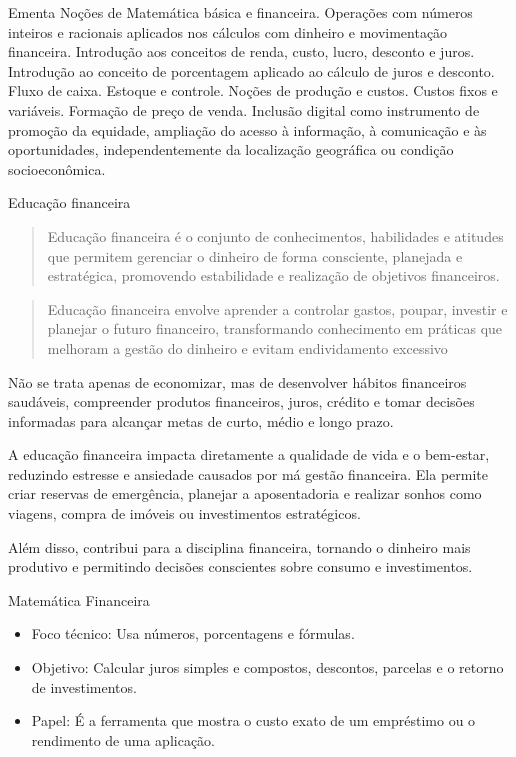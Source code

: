\documentclass{if-beamer}
\begin{document}
	\begin{frame}{Ementa}
		Noções de Matemática básica e financeira. Operações com números
		inteiros e racionais aplicados nos cálculos com dinheiro e 
		movimentação financeira. Introdução aos conceitos de renda, custo, lucro, desconto e juros. Introdução ao conceito de porcentagem aplicado ao cálculo de juros e desconto. Fluxo de caixa. Estoque e controle. Noções de produção e custos. Custos	fixos e variáveis. Formação de preço de venda. Inclusão digital como instrumento de promoção da equidade, ampliação do acesso à informação, à comunicação e às oportunidades, independentemente da localização geográfica ou condição socioeconômica.		
	\end{frame}

	\begin{frame}[allowframebreaks]{Educação financeira}
		\begin{quote}
			Educação financeira é o conjunto de conhecimentos, habilidades e atitudes que permitem gerenciar o dinheiro de forma consciente, planejada e estratégica, promovendo estabilidade e realização de objetivos financeiros.
		\end{quote}

	\framebreak

		\begin{quote}
			Educação financeira envolve aprender a controlar gastos, poupar, investir e planejar o futuro financeiro, transformando conhecimento em práticas que melhoram a gestão do dinheiro e evitam endividamento excessivo
		\end{quote}

		\framebreak

		Não se trata apenas de economizar, mas de desenvolver hábitos financeiros saudáveis, compreender produtos financeiros, juros, crédito e tomar decisões informadas para alcançar metas de curto, médio e longo prazo.

		\framebreak
		A educação financeira impacta diretamente a qualidade de vida e o bem-estar, reduzindo estresse e ansiedade causados 	por má gestão financeira. Ela permite criar reservas de emergência, planejar 	a aposentadoria e realizar sonhos como viagens, compra de imóveis ou investimentos estratégicos.
		
		\framebreak
		Além disso, contribui para a disciplina financeira, tornando o dinheiro mais produtivo e permitindo decisões conscientes sobre consumo e investimentos. 
	\end{frame}

	
	\begin{frame}{Matemática Financeira}
		\begin{itemize}
			\item Foco técnico: Usa números, porcentagens e fórmulas.
			\item Objetivo: Calcular juros simples e compostos, descontos, parcelas e o retorno de investimentos.
			\item Papel: É a ferramenta que mostra o custo exato de um empréstimo ou o rendimento de uma aplicação.
		\end{itemize}
	\end{frame}
	
\end{document}
